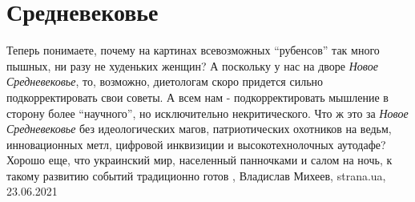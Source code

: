  
 
 
 
 
\chapter{Средневековье}
\label{sec:slova.srednevekovje}

Теперь понимаете, почему на картинах всевозможных \enquote{рубенсов} так много
пышных, ни разу не худеньких женщин?  А поскольку у нас на дворе \emph{Новое
Средневековье}, то, возможно, диетологам скоро придется сильно
подкорректировать свои советы. А всем нам - подкорректировать мышление в
сторону более \enquote{научного}, но исключительно некритического.  Что ж это
за \emph{Новое Средневековье} без идеологических магов, патриотических
охотников на ведьм, инновационных метл, цифровой инквизиции и высокотехнолочных
аутодафе?  Хорошо еще, что украинский мир, населенный панночками и салом на
ночь, к такому развитию событий традиционно готов
, 
Владислав Михеев, strana.ua, 23.06.2021

